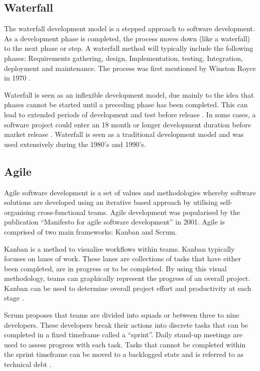 \subsection{Waterfall}

The waterfall development model is a stepped approach to software development. As a development phase is completed, the process moves down (like a waterfall) to the next phase or step. A waterfall method will typically include the following phases: Requirements gathering, design, Implementation, testing, Integration, deployment and maintenance. The process was first mentioned by Winston Royce in 1970 \cite{royce1987managing}. 

Waterfall is seen as an inflexible development model, due mainly to the idea that phases cannot be started until a preceding phase has been completed. This can lead to extended periods of development and test before release \cite{parnas1986rational}. In some cases, a software project could enter an 18 month or longer development duration before market release \cite{mcconnell2004code}. Waterfall is seen as a traditional development model and was used extensively during the 1980's and 1990's. 

\subsection{Agile}

Agile software development is a set of values and methodologies whereby software solutions are developed using an iterative based approach by utilising self-organising cross-functional teams. Agile development was popularised by the publication ``Manifesto for agile software development'' \cite{beck2001manifesto} in 2001. Agile is comprised of two main frameworks: Kanban and Scrum. 

Kanban is a method to visualise workflows within teams. Kanban typically focuses on lanes of work. These lanes are collections of tasks that have either been completed, are in progress or to be completed. By using this visual methodology, teams can graphically represent the progress of an overall project. Kanban can be used to determine overall project effort and productivity at each stage \cite{sugimori1977toyota}.

Scrum proposes that teams are divided into squads or between three to nine developers. These developers break their actions into discrete tasks that can be completed in a fixed timeframe called a ``sprint''. Daily stand-up meetings are used to assess progress with each task. Tasks that cannot be completed within the sprint timeframe can be moved to a backlogged state and is referred to as technical debt \cite{schwaber2002agile}. 

